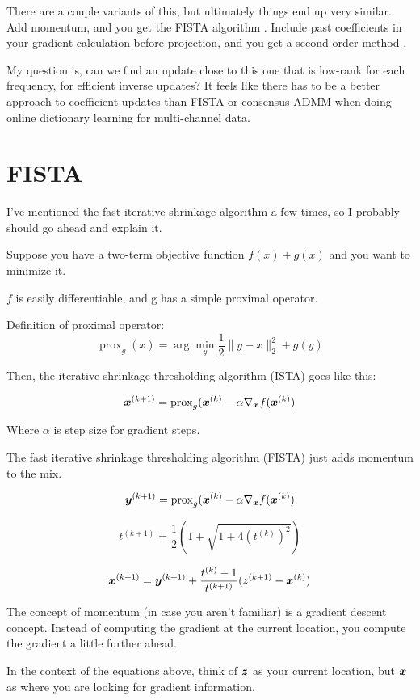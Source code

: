 \documentclass{article}
\begin{document}
There are a couple variants of this, but ultimately things end up very similar. Add momentum, and you get the FISTA algorithm \cite{beck2009fast}. Include past coefficients in your gradient calculation before projection, and you get a second-order method \cite{liu2018first}.

My question is, can we find an update close to this one that is low-rank for each frequency, for efficient inverse updates? It feels like there has to be a better approach to coefficient updates than FISTA or consensus ADMM when doing online dictionary learning for multi-channel data.

\section{FISTA}

I've mentioned the fast iterative shrinkage algorithm a few times, so I probably should go ahead and explain it.

Suppose you have a two-term objective function $f(x) + g(x)$ and you want to minimize it.

$f$ is easily differentiable, and g has a simple proximal operator.

Definition of proximal operator:
\begin{equation}
\operatorname{prox}_g(x) = \arg \min_y \frac{1}{2}\|y - x\|_2^2 + g(y)
\end{equation}

Then, the iterative shrinkage thresholding algorithm (ISTA) goes like this:

\begin{equation}
\bm{x}^{(k + 1)} = \operatorname{prox}_g(\bm{x}^{(k)} - \alpha\nabla_{\bm{x}}f(\bm{x}^{(k)})
\end{equation}

Where $\alpha$ is step size for gradient steps.

The fast iterative shrinkage thresholding algorithm (FISTA) just adds momentum to the mix.

\begin{equation}
\bm{y}^{(k + 1)} = \operatorname{prox}_g(\bm{x}^{(k)} - \alpha\nabla_{\bm{x}}f(\bm{x}^{(k)})
\end{equation}

\begin{equation}
t^{(k + 1)} = \frac{1}{2} (1 + \sqrt{1 + 4(t^{(k)})^2})
\end{equation}

\begin{equation}
\bm{x}^{(k + 1)} = \bm{y}^{(k + 1)} + \frac{t^{(k)} - 1}{t^{(k + 1)}}(z^{(k + 1)} - \bm{x}^{(k)})
\end{equation}

The concept of momentum (in case you aren't familiar) is a gradient descent concept. Instead of computing the gradient at the current location, you compute the gradient a little further ahead.

In the context of the equations above, think of $\bm{z}$ as your current location, but $\bm{x}$ as where you are looking for gradient information.



\end{document}
